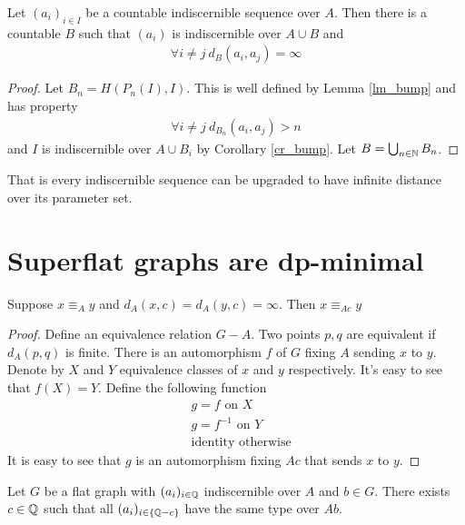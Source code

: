 \documentclass{amsart}
\begin{document}
\begin{Corollary} 
	Let $(a_i)_{i \in I}$ be a countable indiscernible sequence over $A$. Then there is a countable $B$ such that  $(a_i)$ is indiscernible over $A \cup B$ and
	\begin{align*}
		\forall i \neq j \ d_B(a_i, a_j) = \infty
	\end{align*}
\end{Corollary}

\begin{proof}
	Let $B_n = H(P_n(I), I)$. This is well defined by Lemma \ref{lm_bump} and has property
	\begin{align*}
		\forall i \neq j \ d_{B_n}(a_i, a_j) > n
	\end{align*}
	and $I$ is indiscernible over $A \cup B_i$ by Corollary \ref{cr_bump}. Let $B = \bigcup_{n \in \mathbb{N}} B_n$.
\end{proof}

That is every indiscernible sequence can be upgraded to have infinite distance over its parameter set.

\section{Superflat graphs are dp-minimal}

\begin{Lemma}
	Suppose $x \equiv_A y$ and $d_A(x, c) = d_A(y, c) = \infty$. Then $x \equiv_{Ac} y$
\end{Lemma}

\begin{proof}
	Define an equivalence relation $G - A$. Two points $p, q$ are equivalent if $d_A(p,q)$ is finite. There is an automorphism $f$ of $G$ fixing $A$ sending $x$ to $y$. Denote by $X$ and $Y$ equivalence classes of $x$ and $y$ respectively. It's easy to see that $f(X) = Y$. Define the following function
	\begin{align*}
		&g = f \text { on } X \\
		&g = f^{-1} \text { on } Y \\
		&\text{identity otherwise}
	\end{align*}
	It is easy to see that $g$ is an automorphism fixing $Ac$ that sends $x$ to $y$.
\end{proof}

\begin{Theorem}
	Let $G$ be a flat graph with $(a_i)_{i\in\mathbb{Q}}$ indiscernible over $A$ and $b \in G$. There exists $c \in \mathbb{Q}$ such that all $(a_i)_{i\in\{\mathbb{Q} - c\}}$ have the same type over $Ab$.
\end{Theorem}
\end{document}
